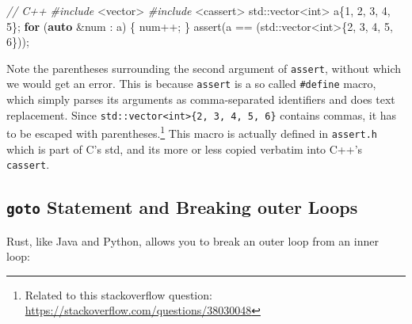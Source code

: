 \documentclass[
]{book}
\newenvironment{Shaded}{\begin{snugshade}}{\end{snugshade}}
\newcommand{\BuiltInTok}[1]{#1}
\newcommand{\CommentTok}[1]{\textcolor[rgb]{0.56,0.35,0.01}{\textit{#1}}}
\newcommand{\ControlFlowTok}[1]{\textcolor[rgb]{0.13,0.29,0.53}{\textbf{#1}}}
\newcommand{\DataTypeTok}[1]{\textcolor[rgb]{0.13,0.29,0.53}{#1}}
\newcommand{\DecValTok}[1]{\textcolor[rgb]{0.00,0.00,0.81}{#1}}
\newcommand{\ImportTok}[1]{#1}
\newcommand{\KeywordTok}[1]{\textcolor[rgb]{0.13,0.29,0.53}{\textbf{#1}}}
\newcommand{\NormalTok}[1]{#1}
\newcommand{\OtherTok}[1]{\textcolor[rgb]{0.56,0.35,0.01}{#1}}
\newcommand{\PreprocessorTok}[1]{\textcolor[rgb]{0.56,0.35,0.01}{\textit{#1}}}
\begin{document}
\begin{Shaded}
\begin{Highlighting}[]
\CommentTok{// C++}
\PreprocessorTok{\#include }\ImportTok{\textless{}vector\textgreater{}}
\PreprocessorTok{\#include }\ImportTok{\textless{}cassert\textgreater{}}
\BuiltInTok{std::}\NormalTok{vector\textless{}}\DataTypeTok{int}\NormalTok{\textgreater{} a\{}\DecValTok{1}\NormalTok{, }\DecValTok{2}\NormalTok{, }\DecValTok{3}\NormalTok{, }\DecValTok{4}\NormalTok{, }\DecValTok{5}\NormalTok{\};}
\ControlFlowTok{for}\NormalTok{ (}\KeywordTok{auto}\NormalTok{ \&num : a)}
\NormalTok{\{}
\NormalTok{    num++;}
\NormalTok{\}}
\OtherTok{assert}\NormalTok{(a == (}\BuiltInTok{std::}\NormalTok{vector\textless{}}\DataTypeTok{int}\NormalTok{\textgreater{}\{}\DecValTok{2}\NormalTok{, }\DecValTok{3}\NormalTok{, }\DecValTok{4}\NormalTok{, }\DecValTok{5}\NormalTok{, }\DecValTok{6}\NormalTok{\}));}
\end{Highlighting}
\end{Shaded}

Note the parentheses surrounding the second argument of \texttt{assert}, without which we would get an error. This is because \texttt{assert} is a so called \texttt{\#define} macro, which simply parses its arguments as comma-separated identifiers and does text replacement. Since \texttt{std::vector\textless{}int\textgreater{}\{2,\ 3,\ 4,\ 5,\ 6\}} contains commas, it has to be escaped with parentheses.\footnote{Related to this stackoverflow question: \url{https://stackoverflow.com/questions/38030048}} This macro is actually defined in \texttt{assert.h} which is part of C's std, and its more or less copied verbatim into C++'s \texttt{cassert}.

\hypertarget{goto-statement-and-breaking-outer-loops}{%
\subsection{\texorpdfstring{\texttt{goto} Statement and Breaking outer Loops}{goto Statement and Breaking outer Loops}}\label{goto-statement-and-breaking-outer-loops}}

Rust, like Java and Python, allows you to break an outer loop from an inner loop:
\end{document}
